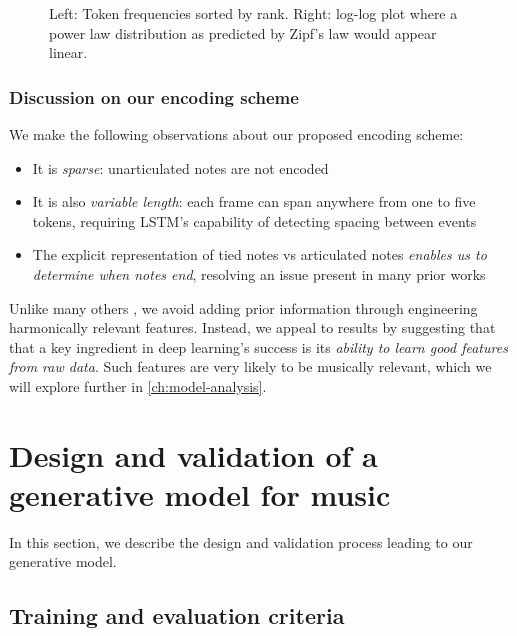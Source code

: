 \begin{figure}[tb]
  \centering
  
  \caption{Left: Token frequencies sorted by rank. Right: log-log plot where
  a power law distribution as predicted by Zipf's law would appear linear.}
  \label{fig:zipf}
\end{figure}

\subsubsection{Discussion on our encoding scheme}

We make the following observations about our proposed encoding scheme:
\begin{itemize}
  \item It is \emph{sparse}: unarticulated notes are not encoded
  \item It is also \emph{variable length}: each frame can span anywhere from one to five tokens, requiring
    LSTM's capability of detecting spacing between events\citep{gers2002learning}
  \item The explicit representation of tied notes vs articulated notes \emph{enables us to
    determine when notes end}, resolving an issue present in many prior works
    \citep{Eck2002,eck2008learning,Liu2014,Brien2016}
\end{itemize}

Unlike many others
\citep{mozer1994neural,franklin2004recurrent,laden1989representation}, we avoid
adding prior information through engineering harmonically relevant features.
Instead, we appeal to results by \citet{bengio2009learning,Bengio2011}
suggesting that that a key ingredient in deep learning's success is its \emph{ability
to learn good features from raw data}. Such features are very likely to be
musically relevant, which we will explore further in \cref{ch:model-analysis}.

\section{Design and validation of a generative model for music}

In this section, we describe the design and validation process leading to our
generative model.

\subsection{Training and evaluation criteria}

